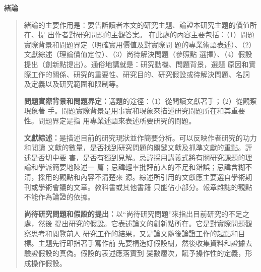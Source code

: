 \documentclass[
    writingLanguage=chinese, %
    addPageTitle=on,  %
    addDeclaration=on, %
    addMUSTlog=off, %
    addFigTOC=on, %
    addTabTOC=on, %
    refIndent=off, %
    printMod=off, %
]{must}
\begin{document}
\noindent\faHandORight 緒論
\begin{quote}
緒論的主要作用是：要告訴讀者本文的研究主題、論證本研究主題的價值所在、提
出作者對研究問題的主觀答案。
在此處的內容主要包括：（1）問題實際背景和問題界定（明確實用價值及對實際問
題的專業術語表述）、（2）文獻綜述（理論價值定位）、（3）尚待解決問題（參照點
選擇）、（4）假設提出（創新點提出）。通俗地講就是：研究動機、問題背景，選題
原因和實際工作的關係、研究的重要性、研究目的、研究假設或待解決問題、名詞
及定義以及研究範圍和限制等。

\textbf{問題實際背景和問題界定：}選題的途徑：（1）從閲讀文獻著手；（2）從觀察現象著
手。問題實際背景是用事實和現象來描述研究問題所在和其重要性。問題界定是指
用專業述語來表述所要研究的問題。

\textbf{文獻綜述：}是描述目前的研究現狀並作簡要分析。可以反映作者研究的功力和閲讀
文獻的數量，是否找到研究問題的關鍵文獻及抓準文獻的重點。評述是否切中要
害，是否有獨到見解。忌諱採用講義式將有關研究課題的理論和學派簡要地陳述一
篇；忌諱輕率批評前人的不足和錯誤；忌諱含糊不清，採用的觀點和內容不清楚來
源。綜述所引用的文獻應主要選自學術期刊或學術會議的文章。教科書或其他書籍
只能佔小部分。報章雜誌的觀點不能作為論證的依據。

\textbf{尚待研究問題和假設的提出：}以“尚待研究問題”來指出目前研究的不足之處，然後
提出研究的假設。它表述論文的創新點所在。它是對實際問題觀察思考和閲覽前人
研究工作的結果，又是論文隨後論證工作的起點和目標。主題先行即指著手寫作前
先要構造好假設樹，然後收集資料和證據去驗證假設的真偽。假設的表述應落實到
變數層次，賦予操作性的定義，形成操作假設。

\end{quote}
\end{document}

